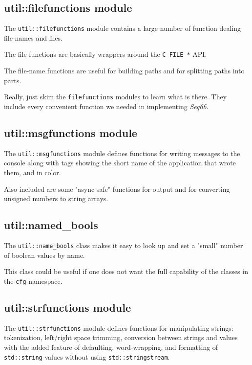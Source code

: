 \subsection{util::filefunctions module}
\label{subsec:util_namespace_filefunctions}

   The \texttt{util::filefunctions} module contains a large number of
   function dealing file-names and files.

   The file functions are basically wrappers around the \texttt{C FILE *}
   API.

   The file-name functions are useful for building paths and for splitting
   paths into parts.

   Really, just skim the \texttt{filefunctions} modules to learn what is
   there.  They include every convenient function we needed in implementing
   \textsl{Seq66}.

\subsection{util::msgfunctions module}
\label{subsec:util_namespace_msgfunctions}

   The \texttt{util::msgfunctions} module defines functions for writing
   messages to the console along with tags showing the short name of the
   application that wrote them, and in color.

   Also included are some "async safe" functions for output and for
   converting unsigned numbers to string arrays.

\subsection{util::named\_bools}
\label{subsec:util_namespace_named_bools}

   The \texttt{util::name\_bools} class
   makes it easy to look up and set a "small" number of
   boolean values by name.

   This class could be useful if one does not want the full capability
   of the classes in the \texttt{cfg} namespace.

\subsection{util::strfunctions module}
\label{subsec:util_namespace_strfunctions}

   The \texttt{util::strfunctions} module defines functions for manipulating
   strings: tokenization, left/right space trimming, conversion between
   strings and values with the added feature of defaulting, word-wrapping,
   and formatting of \texttt{std::string} values without using
   \texttt{std::stringstream}.

